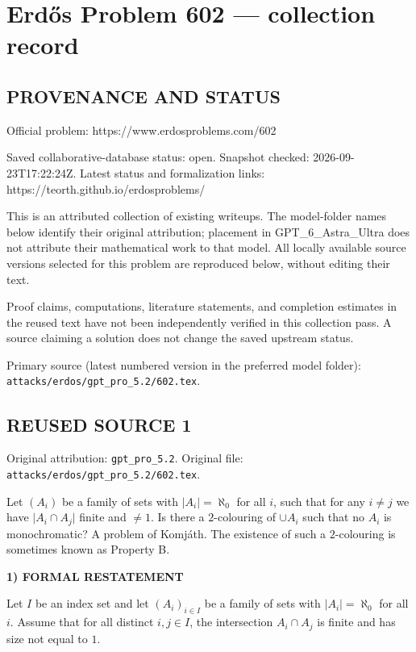 \section*{Erd\H{o}s Problem 602 --- collection record}

\subsection*{PROVENANCE AND STATUS}
Official problem: https://www.erdosproblems.com/602

Saved collaborative-database status: open.
Snapshot checked: 2026-09-23T17:22:24Z.
Latest status and formalization links: https://teorth.github.io/erdosproblems/

This is an attributed collection of existing writeups. The model-folder names below identify their original attribution; placement in GPT\_6\_Astra\_Ultra does not attribute their mathematical work to that model. All locally available source versions selected for this problem are reproduced below, without editing their text.

Proof claims, computations, literature statements, and completion estimates in the reused text have not been independently verified in this collection pass. A source claiming a solution does not change the saved upstream status.

Primary source (latest numbered version in the preferred model folder): \texttt{attacks/erdos/gpt\_pro\_5.2/602.tex}.

\subsection*{REUSED SOURCE 1}
Original attribution: \texttt{gpt\_pro\_5.2}.
Original file: \texttt{attacks/erdos/gpt\_pro\_5.2/602.tex}.


Let $(A_i)$ be a family of sets with $\lvert A_i\rvert=\aleph_0$ for all $i$, such that for any $i\neq j$ we have $\lvert A_i\cap A_j\rvert$ finite and $\neq 1$. Is there a $2$-colouring of $\cup A_i$ such that no $A_i$ is monochromatic? A problem of Komj\'{a}th. The existence of such a $2$-colouring is sometimes known as Property B.

\noindent\textbf{1) FORMAL RESTATEMENT}\par
Let $I$ be an index set and let $(A_i)_{i\in I}$ be a family of sets with $|A_i|=\aleph_0$ for all $i$.
Assume that for all distinct $i,j\in I$, the intersection $A_i\cap A_j$ is finite and has size not equal to $1$.


